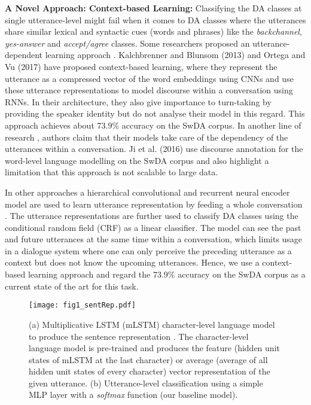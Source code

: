 \documentclass[10pt, a4paper]{article}
\begin{document}
\textbf{A Novel Approach: Context-based Learning:}
Classifying the DA classes at single utterance-level might fail when it comes to DA classes where the utterances share similar lexical and syntactic cues (words and phrases) like the \textit{backchannel}, \textit{yes-answer} and \textit{accept/agree} classes.
Some researchers proposed an utterance-dependent learning approach \cite{kalchbrenner2013recurrent,ji2016latent,kumar2017dasl,tzh2017EMNLP,ltAl2017EMNLP,ortega2017neural,Meng2017}. 
Kalchbrenner and Blunsom (2013) and Ortega and Vu (2017) have proposed context-based learning, where they represent the utterance as a compressed vector of the word embeddings using CNNs and use these utterance representations to model discourse within a conversation using RNNs. 
In their architecture, they also give importance to turn-taking by providing the speaker identity but do not analyse their model in this regard.
This approach achieves about 73.9\% accuracy on the SwDA corpus.
In another line of research \cite{ji2016latent,kumar2017dasl}, authors claim that their models take care of the dependency of the utterances within a conversation.
Ji et al. (2016) use discourse annotation for the word-level language modelling on the SwDA corpus and also highlight a limitation that this approach is not scalable to large data.

In other approaches a hierarchical convolutional and recurrent neural encoder model are used to learn utterance representation by feeding a whole conversation \cite{kumar2017dasl,ltAl2017EMNLP}.
The utterance representations are further used to classify DA classes using the conditional random field (CRF) as a linear classifier.
The model can see the past and future utterances at the same time within a conversation, which limits usage in a dialogue system where one can only perceive the preceding utterance as a context but does not know the upcoming utterances.
Hence, we use a context-based learning approach and regard the 73.9\% accuracy \cite{kalchbrenner2013recurrent} on the SwDA corpus as a current state of the art for this task.

\begin{figure}[t]
\begin{center}
\texttt{[image: fig1\_sentRep.pdf]} 
\caption{(a) Multiplicative LSTM (mLSTM) character-level language model to produce the sentence representation .
The character-level language model is pre-trained and produces the feature (hidden unit states of mLSTM at the last character) or average (average of all hidden unit states of every character) vector representation of the given utterance. (b) Utterance-level classification using a simple MLP layer with a \textit{softmax} function (our baseline model).}
\label{sent_rep}
\end{center}
\end{figure}
\end{document}
